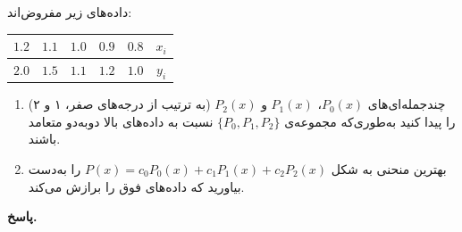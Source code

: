 داده‌های زیر مفروض‌اند:
\begin{center}
	\begin{tabular}{ccccc|c}
		 \(1.2\)& \(1.1\) &\(1.0\)&\(0.9\) & \(0.8\) & \(x_i\)\\
		\hline
		\(2.0\)& \(1.5\) & \(1.1\) & \(1.2\) &\( 1.0\) & \(y_i\)
	\end{tabular}
\end{center}
\begin{enumerate}
	\item[الف)] چندجمله‌ای‌های
	\(P_0(x)\)،
	\(P_1(x)\) و
	\(P_2(x)\)
	(به ترتیب از درجه‌های صفر، ۱ و ۲) را پیدا کنید به‌طوری‌که مجموعه‌ی
	\(\{P_0, P_1, P_2\}\)
	نسبت به داده‌های بالا دو‌به‌دو متعامد باشند.
	\vspace*{.3cm}
	\item[ب)] 
	بهترین منحنی به شکل 
	\(P(x) = c_0P_0(x)+c_1P_1(x)+c_2P_2(x)\)
	را به‌دست بیاورید که داده‌های فوق را برازش می‌کند.
\end{enumerate}



\begin{answer}

	\textbf{پاسخ.}
	
\end{answer}
